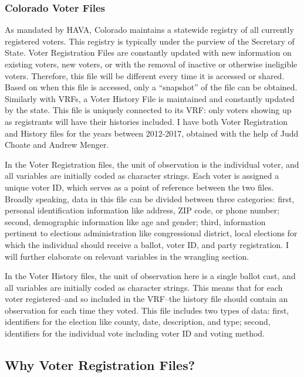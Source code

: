 \documentclass[12pt,twoside]{reedthesis}
\begin{document}
  \subsubsection{Colorado Voter Files}\label{colorado-voter-files}
  
  As mandated by HAVA, Colorado maintains a statewide registry of all
  currently registered voters. This registry is typically under the
  purview of the Secretary of State. Voter Registration Files are
  constantly updated with new information on existing voters, new voters,
  or with the removal of inactive or otherwise ineligible voters.
  Therefore, this file will be different every time it is accessed or
  shared. Based on when this file is accessed, only a ``snapshot'' of the
  file can be obtained. Similarly with VRFs, a Voter History File is
  maintained and constantly updated by the state. This file is uniquely
  connected to its VRF: only voters showing up as registrants will have
  their histories included. I have both Voter Registration and History
  files for the years between 2012-2017, obtained with the help of Judd
  Choate and Andrew Menger.
  
  In the Voter Registration files, the unit of observation is the
  individual voter, and all variables are initially coded as character
  strings. Each voter is assigned a unique voter ID, which serves as a
  point of reference between the two files. Broadly speaking, data in this
  file can be divided between three categories: first, personal
  identification information like address, ZIP code, or phone number;
  second, demographic information like age and gender; third, information
  pertinent to elections administration like congressional district, local
  elections for which the individual should receive a ballot, voter ID,
  and party registration. I will further elaborate on relevant variables
  in the wrangling section.
  
  In the Voter History files, the unit of observation here is a single
  ballot cast, and all variables are initially coded as character strings.
  This means that for each voter registered--and so included in the
  VRF--the history file should contain an observation for each time they
  voted. This file includes two types of data: first, identifiers for the
  election like county, date, description, and type; second, identifiers
  for the individual vote including voter ID and voting method.
  
  \subsection{Why Voter Registration
  Files?}\label{why-voter-registration-files}
  
\end{document}
